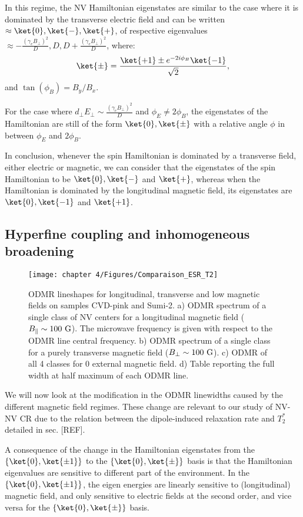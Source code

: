 \documentclass[a4paper,11pt]{report}
\begin{document}
\begin{refsection}
In this regime, the NV Hamiltonian eigenstates are similar to the case where it is dominated by the transverse electric field and can be written $\approx \ket{0}, \ket{-}, \ket{+}$\citep{qiu2021nuclear, qiu2022nanoscale}, of respective eigenvalues $\approx -\frac{(\gamma_e B_\perp)^2}{D},D,D+\frac{(\gamma_e B_\perp)^2}{D}$,  where:
\begin{equation}
\ket{\pm}=\frac{\ket{+1}\pm e^{-2i\phi_B}\ket{-1}}{\sqrt{2}},
\end{equation}
and $\tan(\phi_B)=B_y/B_x$.

For the case where $d_\perp E_\perp \sim \frac{(\gamma_e B_\perp)^2}{D}$ and $\phi_E \neq 2\phi_B$, the eigenstates of the Hamiltonian are still of the form $\ket{0},\ket{\pm}$ with a relative angle $\phi$ in between $\phi_E$ and $2\phi_B$.

In conclusion, whenever the spin Hamiltonian is dominated by a transverse field, either electric or magnetic, we can consider that the eigenstates of the spin Hamiltonian to be $\ket{0}, \ket{-}$ and $\ket{+}$, whereas when the Hamiltonian is dominated by the longitudinal magnetic field, its eigenstates are $\ket{0}, \ket{-1}$ and $\ket{+1}$.

\subsection{Hyperfine coupling and inhomogeneous broadening}
\label{sec modif T2*}
\begin{figure}[h]
\centering
\texttt{[image: chapter 4/Figures/Comparaison\_ESR\_T2]}
\caption{ODMR lineshapes for longitudinal, transverse and low magnetic fields on samples CVD-pink and Sumi-2. a) ODMR spectrum of a single class of NV centers for a longitudinal magnetic field ($B_\parallel \sim 100\ \rm G$). The microwave frequency is given with respect to the ODMR line central frequency. b) ODMR spectrum of a single class for a purely transverse magnetic field ($B_\perp \sim 100\ \rm G$). c) ODMR of all 4 classes for 0 external magnetic field. d) Table reporting the full width at half maximum of each ODMR line.}
\label{ESR for T2*}
\end{figure}

We will now look at the modification in the ODMR linewidths caused by the different magnetic field regimes. These change are relevant to our study of NV-NV CR due to the relation between the dipole-induced relaxation rate and $T_2^*$ detailed in sec. [REF].

A consequence of the change in the Hamiltonian eigenstates from the $\{ \ket{0}, \ket{\pm 1} \}$ to the $\{ \ket{0}, \ket{\pm} \}$ basis is that the Hamiltonian eigenvalues are sensitive to different part of the environment. In the $\{ \ket{0}, \ket{\pm 1} \}$, the eigen energies are linearly sensitive to (longitudinal) magnetic field, and only sensitive to electric fields at the second order, and vice versa for the $\{ \ket{0}, \ket{\pm} \}$ basis.


\end{refsection}
\end{document}
